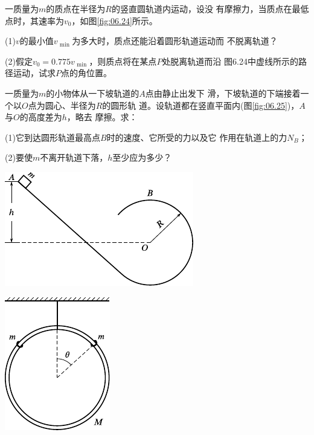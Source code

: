\begin{exercises}
\exercise 一质量为$ m $的质点在半径为$ R $的竖直圆轨道内运动，设没
有摩擦力，当质点在最低点时，其速率为$ v_ 0 $，如图\ref{fig:06.24}\;所示。

(1)\;$ v $的最小值$ v _ { \text { min } } $为多大时，质点还能沿着圆形轨道运动而
不脱离轨道？

(2)假定$ v _ { 0 } = 0.775 v _ { \text { min } } $，则质点将在某点$ P $处脱离轨道而沿
图6.24中虚线所示的路径运动，试求$ P $点的角位置。

\exercise 一质量为$ m $的小物体从一下坡轨道的$ A $点由静止出发下
滑，下坡轨道的下端接着一个以$ O $点为圆心、半径为$ R $的圆形轨
道。设轨道都在竖直平面内(图\ref{fig:06.25})，$ A $与$ O $的高度差为$ h $，略去
摩擦。求：

(1)它到达圆形轨道最高点$ B $时的速度、它所受的力以及它
作用在轨道上的力$ N _ { B } $；

(2)要使$ m $不离开轨道下落，$ h $至少应为多少？

\vspace{1.56em}
\begin{figurex}
  \begin{minipage}[b]{0.63\linewidth}
    \centering
    \includegraphics{figure/fig06.25}
    \caption{}
    \label{fig:06.25}
  \end{minipage}
  \begin{minipage}[b]{0.35\linewidth}
    \centering
    \includegraphics{figure/fig06.26}
    \caption{}
    \label{fig:06.26}
  \end{minipage}
\end{figurex}
\vspace{1.56em}


\end{exercises}
